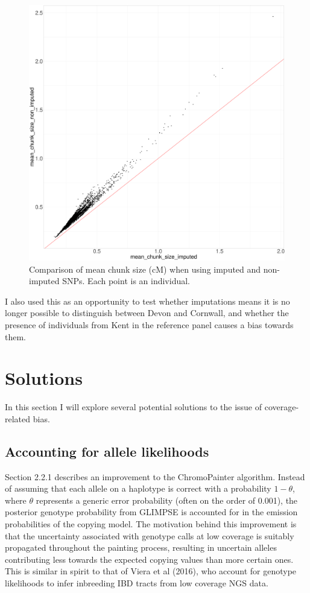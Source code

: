 \begin{figure}[htp]
    \centering
    \includegraphics[width=1.0\textwidth]{../images/chapter1/mean_chunk_size_comparison.pdf}
    \caption{Comparison of mean chunk size (cM) when using imputed and non-imputed SNPs. Each point is an individual.}
    \label{fig:mean_chunk_size_comparison}
\end{figure}


I also used this as an opportunity to test whether imputations means it is no longer possible to distinguish between Devon and Cornwall, and whether the presence of individuals from Kent in the reference panel causes a bias towards them. 


\section{Solutions}

In this section I will explore several potential solutions to the issue of coverage-related bias.

\subsection{Accounting for allele likelihoods}

Section 2.2.1 describes an improvement to the ChromoPainter algorithm. Instead of assuming that each allele on a haplotype is correct with a probability $1-\theta$, where $\theta$ represents a generic error probability (often on the order of 0.001), the posterior genotype probability from GLIMPSE is accounted for in the emission probabilities of the copying model. The motivation behind this improvement is that the uncertainty associated with genotype calls at low coverage is suitably propagated throughout the painting process, resulting in uncertain alleles contributing less towards the expected copying values than more certain ones. This is similar in spirit to that of Viera et al (2016), who account for genotype likelihoods to infer inbreeding IBD tracts from low coverage NGS data.

